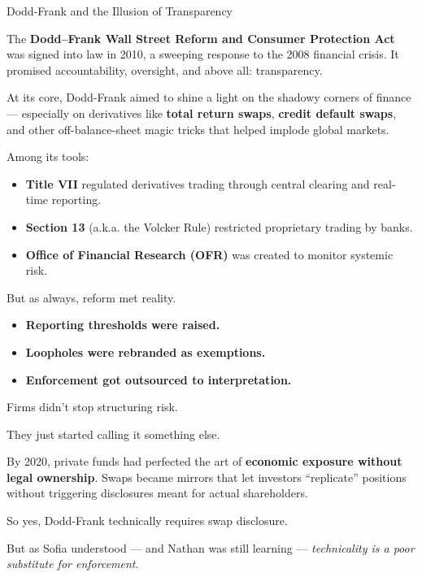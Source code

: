 \begin{HistoricalSidebar}{Dodd-Frank and the Illusion of Transparency}

    The \textbf{Dodd–Frank Wall Street Reform and Consumer Protection Act} was signed into law in 2010, 
    a sweeping response to the 2008 financial crisis. It promised accountability, oversight, and above 
    all: transparency.
    
    \medskip
    
    At its core, Dodd-Frank aimed to shine a light on the shadowy corners of finance — especially on 
    derivatives like \textbf{total return swaps}, \textbf{credit default swaps}, and other off-balance-sheet 
    magic tricks that helped implode global markets.
    
    \medskip
    
    Among its tools:

    \medskip
    
    
    \begin{itemize}
      \item \textbf{Title VII} regulated derivatives trading through central clearing and real-time reporting.
      \item \textbf{Section 13} (a.k.a. the Volcker Rule) restricted proprietary trading by banks.
      \item \textbf{Office of Financial Research (OFR)} was created to monitor systemic risk.
    \end{itemize}
    
    \medskip
    
    But as always, reform met reality.

    \medskip
   
    \begin{itemize}
        \item \textbf{Reporting thresholds were raised.}
        \item \textbf{Loopholes were rebranded as exemptions.}
        \item \textbf{Enforcement got outsourced to interpretation.}
    \end{itemize}
    
    \medskip
    
    Firms didn’t stop structuring risk.

    \medskip
    
    They just started calling it something else.
    
    \medskip
    
    By 2020, private funds had perfected the art of \textbf{economic exposure without legal ownership}. Swaps 
    became mirrors that let investors “replicate” positions without triggering disclosures meant for 
    actual shareholders.
    
    \medskip
    
    So yes, Dodd-Frank technically requires swap disclosure.

    \medskip
    
    But as Sofia understood — and Nathan was still learning — \textit{technicality is a poor substitute 
    for enforcement}.
    
\end{HistoricalSidebar}

